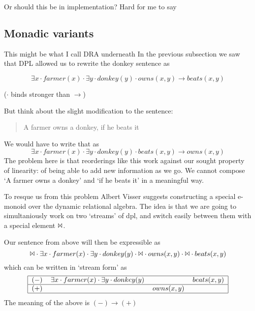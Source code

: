 \documentclass[12pt]{article}
\begin{document}
Or should this be in implementation? Hard for me to say



\subsection{Monadic variants}
This might be what I call DRA underneath
In the previous subsection we saw that DPL allowed us to rewrite the donkey sentence as 

\begin{equation}
\exists x \cdot farmer(x) \cdot \exists y \cdot donkey(y) \cdot owns(x,y) \rightarrow beats(x,y)
\end{equation}

($\cdot$ binds stronger than $\rightarrow$)

But think about the slight modification to the sentence:
%
\begin{quotation}
A farmer owns a donkey, if he beats it
\end{quotation}
%
We would have to write that as
%
\begin{equation}
\exists x \cdot farmer(x) \cdot \exists y \cdot donkey(y) \cdot beats(x,y) \rightarrow owns(x,y)
\end{equation}
%
The problem here is that reorderings like this work against our sought property of linearity: of being able to add new information as we go. We cannot compose `A farmer owns a donkey' and `if he beats it' in a meaningful way.

To resque us from this problem Albert Visser suggests constructing a special e-monoid over the dynamic relational algebra. The idea is that we are going to simultaniously work on two `streams' of dpl, and switch easily between them with a special element $\Bowtie$.

Our sentence from above will then be expressible as
%
\begin{equation}
\Bowtie \cdot \exists x \cdot farmer(x) \cdot \exists y \cdot donkey(y) \cdot \Bowtie \cdot owns(x,y) \cdot \Bowtie \cdot beats(x,y)
\end{equation}
%
which can be written in `stream form' as
%
\begin{equation}
\begin{tabular}{|clll|}
    \hline
    $(-)$ & $\exists x \cdot farmer(x) \cdot \exists y \cdot donkey(y)$ & ~ & $beats(x,y)$ \\\hline
    $(+)$ & ~ & $owns(x,y)$ & ~ \\\hline
\end{tabular}
\end{equation}
%
The meaning of the above is $(-) \rightarrow (+)$
\end{document}
